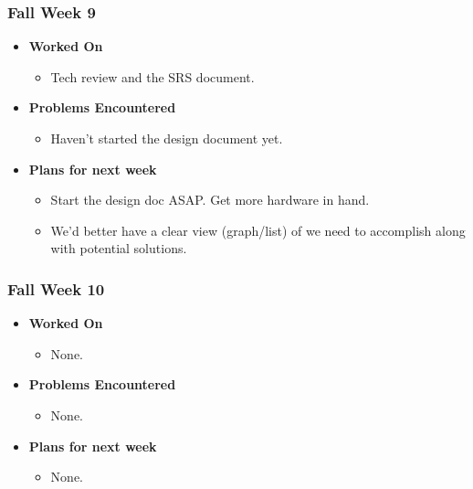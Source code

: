 \documentclass{article}
\begin{document}
\subsubsection{Fall Week 9}
\begin{itemize}
    \item {\textbf{Worked On}}
    \begin{itemize}
      \item Tech review and the SRS document.
    \end{itemize}

    \item {\textbf{Problems Encountered}}
    \begin{itemize}
      \item Haven't started the design document yet.
    \end{itemize}

    \item{\textbf{Plans for next week}}
    \begin{itemize}
      \item Start the design doc ASAP. Get more hardware in hand.
      \item We'd better have a clear view (graph/list) of we need
      to accomplish along with potential solutions.
    \end{itemize}

\end{itemize}

\subsubsection{Fall Week 10}
\begin{itemize}
    \item {\textbf{Worked On}}
    \begin{itemize}
      \item None.
    \end{itemize}

    \item {\textbf{Problems Encountered}}
    \begin{itemize}
      \item None.
    \end{itemize}

    \item{\textbf{Plans for next week}}
    \begin{itemize}
      \item None.
    \end{itemize}

\end{itemize}
\end{document}
